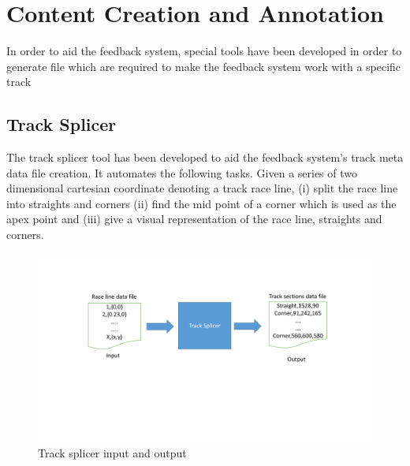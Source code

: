 \section{Content Creation and Annotation}
\label{sec:imp-supportingTools}
In order to aid the feedback system, special tools have been developed in order to generate file which are required to make the feedback system work with a specific track

\subsection{Track Splicer}
\label{sec:imp-trackSplicer}
The track splicer tool has been developed to aid the feedback system's track meta data file creation. It automates the following tasks. Given a series of two dimensional cartesian coordinate denoting a track race line, (i) split the race line into straights and corners (ii) find the mid point of a corner which is used as the apex point and (iii) give a visual representation of the race line, straights and corners. 

\begin{figure}[!htb]
	\centering
	\includegraphics[width=\textwidth]{diagrams/trackspliceinputoutput.pdf}
	\caption[track splicer input out]{Track splicer input and output}
	\label{fig:diagram-trackspliceinputoutput}
\end{figure}

